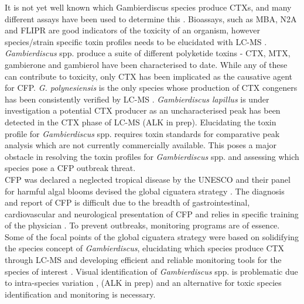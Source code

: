 \documentclass[12pt]{article}
\begin{document}
It is not yet well known which Gambierdiscus species produce CTXs, and many different assays have been used to determine this \citep{globalcig}. Bioassays, such as MBA, N2A and FLIPR are good indicators of the toxicity of an organism, however species/strain specific toxin profiles needs to be elucidated with LC-MS \citep{diogened2014chemistry}. \emph{Gambierdiscus} spp. produce a suite of different polyketide toxins - CTX, MTX, gambierone and gambierol have been characterised to date. While any of these can contribute to toxicity, only CTX has been implicated as the causative agent for CFP. \textit{G. polynesiensis} is the only species whose production of CTX congeners has been consistently verified by LC-MS \citep{chinain2010growth}. \emph{Gambierdiscus lapillus} is under investigation a potential CTX producer as an uncharacterised peak has been detected in the CTX phase of LC-MS (ALK in prep). Elucidating the toxin profile for \textit{Gambierdiscus} spp. requires toxin standards for comparative peak analysis which are not currently commercially available. This poses a major obstacle in resolving the toxin profiles for \textit{Gambierdiscus} spp. and assessing which species pose a CFP outbreak threat. \\

CFP was declared a neglected tropical disease by the UNESCO and their panel for harmful algal blooms devised the global ciguatera strategy \citep{globalcig}.
The diagnosis and report of CFP is difficult due to the breadth of gastrointestinal, cardiovascular and neurological presentation of CFP and relies in specific training of the physician \citep{sims1987theoretical}. 
To prevent outbreaks, monitoring programs are of essence. Some of the focal points of the global ciguatera strategy were based on solidifying the species concept of \emph{Gambierdiscus}, elucidating which species produce CTX through LC-MS and developing efficient and reliable monitoring tools for the species of interest \citep{globalcig}. Visual identification of \emph{Gambierdiscus} spp. is problematic due to intra-species variation \citep{kohli2014high}, (ALK in prep) and an alternative for toxic species identification and monitoring is necessary. \\
\end{document}
